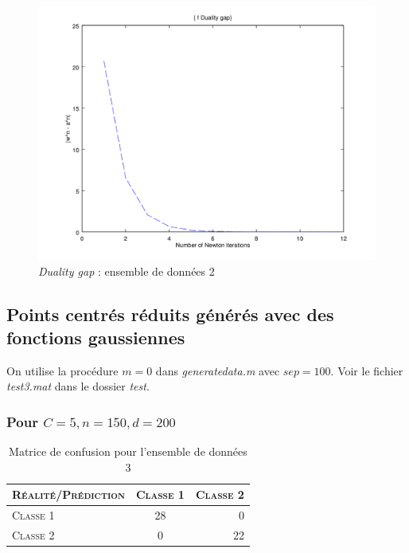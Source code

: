 \documentclass{article}
\begin{document}
         \begin{figure}[H]
           \begin{center}
             \includegraphics[scale=0.5]{images/duality2.png}
             \caption{\emph{Duality gap} : ensemble de données 2}
           \end{center}
         \end{figure}

\subsection{Points centrés réduits générés avec des fonctions gaussiennes}

On utilise la procédure $m = 0$ dans \emph{generatedata.m} avec $sep=100$. Voir le fichier \emph{test3.mat} dans le dossier \emph{test}. 

\subsubsection{Pour $C=5, n=150, d=200$}

     \begin{table}[H]
       \caption{Matrice de confusion pour l'ensemble de données 3}
       \begin{tabular}{|l|c|r|}
         \hline
         \textsc{Réalité/Prédiction} & \textsc{Classe 1} & \textsc{Classe 2}\\
         \hline
         \textsc{Classe 1} & 28 & 0\\
         \hline
         \textsc{Classe 2} & 0 & 22\\
         \hline
       \end{tabular}
     \end{table}
\end{document}
